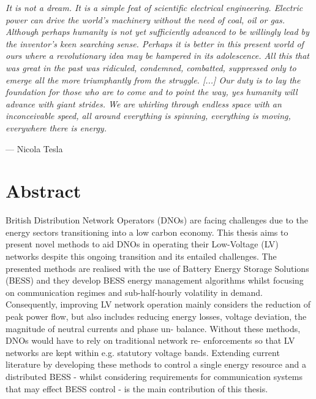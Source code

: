 
\epigraph{\textit{It is not a dream. It is a simple feat of scientific electrical engineering. Electric power can drive the world's machinery without the need of coal, oil or gas. Although perhaps humanity is not yet sufficiently advanced to be willingly lead by the inventor's keen searching sense. Perhaps it is better in this present world of ours where a revolutionary idea may be hampered in its adolescence. All this that was great in the past was ridiculed, condemned, combatted, suppressed only to emerge all the more triumphantly from the struggle. [...] Our duty is to lay the foundation for those who are to come and to point the way, yes humanity will advance with giant strides. We are whirling through endless space with an inconceivable speed, all around everything is spinning, everything is moving, everywhere there is energy.}}{--- Nicola Tesla}


\chapter*{Abstract}




British Distribution Network Operators (DNOs) are facing challenges due to the\linebreak
energy sectors transitioning into a low carbon economy. This thesis aims to present\linebreak
novel methods to aid DNOs in operating their Low-Voltage (LV) networks despite this\linebreak
ongoing transition and its entailed challenges. The presented methods are realised\linebreak
with the use of Battery Energy Storage Solutions (BESS) and they develop BESS\linebreak
energy management algorithms whilst focusing on communication regimes and\linebreak
sub-half-hourly volatility in demand. Consequently, improving LV network operation\linebreak
mainly considers the reduction of peak power flow, but also includes reducing\linebreak
energy losses, voltage deviation, the magnitude of neutral currents and phase un-\linebreak
balance. Without these methods, DNOs would have to rely on traditional network re-\linebreak
enforcements so that LV networks are kept within e.g. statutory voltage bands.\linebreak
Extending current literature by developing these methods to control a single energy\linebreak
resource and a distributed BESS - whilst considering requirements for communication\linebreak
systems that may effect BESS control - is the main contribution of this thesis.

